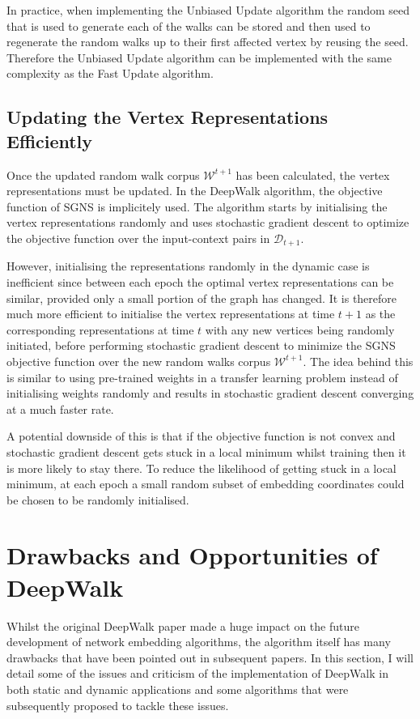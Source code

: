 \documentclass[a4paper]{article}
\newcommand{\D}{\mathcal D}
\newcommand{\W}{\mathcal W}
\begin{document}
In practice, when implementing the Unbiased Update algorithm the random seed
that is used to generate each of the walks can be stored and then used to
regenerate the random walks up to their first affected vertex by reusing the
seed. Therefore the Unbiased Update algorithm can be implemented with the same
complexity as the Fast Update algorithm.

\subsection{Updating the Vertex Representations Efficiently}
Once the updated random walk corpus $\W^{t+1}$ has been calculated, the vertex
representations must be updated. In the DeepWalk algorithm, the objective function of SGNS is implicitely used.
The algorithm starts by initialising the vertex representations randomly and
uses stochastic gradient descent to optimize the objective function over the
input-context pairs in $\D_{t+1}$.

However, initialising the representations randomly in the dynamic case is
inefficient since between each epoch the optimal vertex representations can be similar, provided only a small portion of the graph has changed. It is therefore much more efficient to initialise the vertex
representations at time $t+1$ as the corresponding representations at time $t$
with any new vertices being randomly initiated, before performing stochastic gradient
descent to minimize the SGNS objective function over the new random walks corpus
$\W^{t+1}$. The idea behind this is similar to using pre-trained weights in a transfer
learning problem instead of initialising weights randomly and results in
stochastic gradient descent converging at a much faster rate.

A potential downside of this is that if the objective function is not convex and
stochastic gradient descent gets stuck in a local minimum whilst training then it
is more likely to stay there. To reduce the likelihood of getting stuck in a local
minimum, at each epoch a small random subset of embedding coordinates could be chosen to be randomly initialised.

\section{Drawbacks and Opportunities of DeepWalk}
Whilst the original DeepWalk paper made a huge impact on the future development
of network embedding algorithms, the algorithm itself has many drawbacks that have been pointed out in subsequent papers. In this section, I will detail some of the issues and criticism of the implementation of
DeepWalk in both static and dynamic applications and some algorithms that were subsequently proposed to tackle these issues.\\
\end{document}

